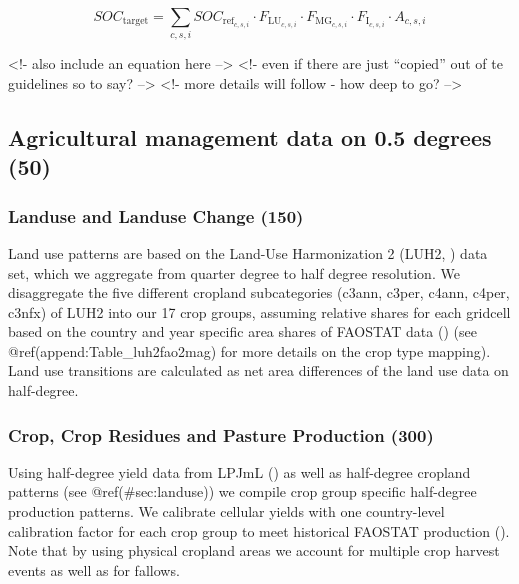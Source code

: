 \documentclass[gc, manuscript]{copernicus}
\begin{document}
\begin{equation}
SOC_{\text{target}} = \sum_{c,s,i} SOC_{\text{ref}_{c,s,i}} \cdot F_{\text{LU}_{c,s,i}} \cdot F_{\text{MG}_{c,s,i}} \cdot F_{\text{I}_{c,s,i}} \cdot A_{c,s,i}
\label{eq:tier1}
\end{equation}

\textless!- also include an equation here --\textgreater{} \textless!-
even if there are just ``copied'' out of te guidelines so to say?
--\textgreater{} \textless!- more details will follow - how deep to go?
--\textgreater{}

\hypertarget{sec:agrimanagement}{%
\subsection{Agricultural management data on 0.5 degrees
(50)}\label{sec:agrimanagement}}

\hypertarget{sec:landuse}{%
\subsubsection{Landuse and Landuse Change (150)}\label{sec:landuse}}

Land use patterns are based on the Land-Use Harmonization 2 (LUH2,
\citep{LUH2}) data set, which we aggregate from quarter degree to half
degree resolution. We disaggregate the five different cropland
subcategories (c3ann, c3per, c4ann, c4per, c3nfx) of LUH2 into our 17
crop groups, assuming relative shares for each gridcell based on the
country and year specific area shares of FAOSTAT data (\citep{FAOSTAT})
(see @ref(append:Table\_luh2fao2mag) for more details on the crop type
mapping). Land use transitions are calculated as net area differences of
the land use data on half-degree.

\subsubsection{Crop, Crop Residues and Pasture Production (300)}

Using half-degree yield data from LPJmL (\citep{LPJmL4_1}) as well as
half-degree cropland patterns (see @ref(\#sec:landuse)) we compile crop
group specific half-degree production patterns. We calibrate cellular
yields with one country-level calibration factor for each crop group to
meet historical FAOSTAT production (\citep{FAOSTAT}). Note that by using
physical cropland areas we account for multiple crop harvest events as
well as for fallows.
\end{document}
